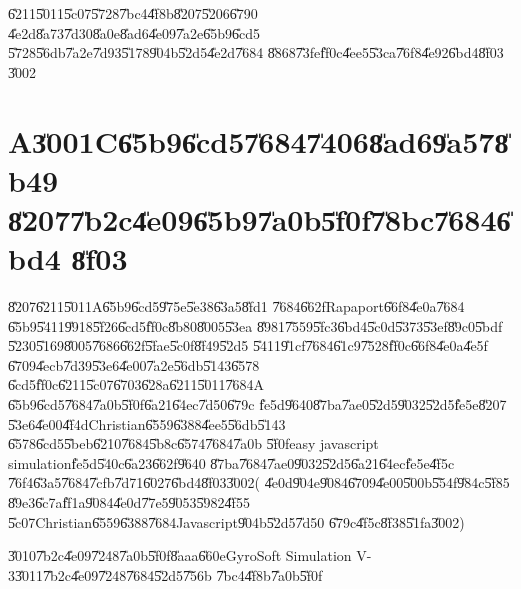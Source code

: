 \bigskip

\U{6211}\U{5011}\U{5c07}\U{5728}\U{7bc4}\U{4f8b}\U{8207}\U{5206}\U{6790}%
\U{4e2d}\U{8a73}\U{7d30}\U{8a0e}\U{8ad6}\U{4e09}\U{7a2e}\U{65b9}\U{6cd5}%
\U{5728}\U{56db}\U{7a2e}\U{7d93}\U{5178}\U{904b}\U{52d5}\U{4e2d}\U{7684}%
\U{8868}\U{73fe}\U{ff0c}\U{4ee5}\U{53ca}\U{76f8}\U{4e92}\U{6bd4}\U{8f03}%
\U{3002}

\section{A\U{3001}C\U{65b9}\U{6cd5}\U{7684}\U{7406}\U{8ad6}\U{9a57}\U{8b49}%
\U{8207}\U{7b2c}\U{4e09}\U{65b9}\U{7a0b}\U{5f0f}\U{78bc}\U{7684}\U{6bd4}%
\U{8f03}}

\U{8207}\U{6211}\U{5011}A\U{65b9}\U{6cd5}\U{975e}\U{5e38}\U{63a5}\U{8fd1}%
\U{7684}\U{662f}Rapaport\U{66f8}\U{4e0a}\cite[Page 232]{rapaport}\U{7684}%
\U{65b9}\U{5411}\U{9918}\U{5f26}\U{6cd5}\U{ff0c}\U{8b80}\U{8005}\U{53ea}%
\U{8981}\U{7559}\U{5fc3}\U{6bd4}\U{5c0d}\U{5373}\U{53ef}\U{89c0}\U{5bdf}%
\U{5230}\U{5169}\U{8005}\U{7686}\U{662f}\U{5fae}\U{5c0f}\U{8f49}\U{52d5}%
\U{5411}\U{91cf}\U{7684}\U{61c9}\U{7528}\U{ff0c}\U{66f8}\U{4e0a}\U{4e5f}%
\U{6709}\U{4ecb}\U{7d39}\U{53e6}\U{4e00}\U{7a2e}\U{56db}\U{5143}\U{6578}%
\U{6cd5}\U{ff0c}\U{6211}\U{5c07}\U{6703}\U{628a}\U{6211}\U{5011}\U{7684}A%
\U{65b9}\U{6cd5}\U{7684}\U{7a0b}\U{5f0f}\U{6a21}\U{64ec}\U{7d50}\U{679c}%
\U{fe5d}\U{9640}\U{87ba}\U{7ae0}\U{52d5}\U{9032}\U{52d5}\U{fe5e}\U{8207}%
\U{53e6}\U{4e00}\U{4f4d}Christian\U{6559}\U{6388}\U{4ee5}\U{56db}\U{5143}%
\U{6578}\U{6cd5}\U{5beb}\U{6210}\U{7684}\U{5b8c}\U{6574}\U{7684}\U{7a0b}%
\U{5f0f}easy javascript simulation\U{fe5d}\U{540c}\U{6a23}\U{662f}\U{9640}%
\U{87ba}\U{7684}\U{7ae0}\U{9032}\U{52d5}\U{6a21}\U{64ec}\U{fe5e}\U{4f5c}%
\U{76f4}\U{63a5}\U{7684}\U{7cfb}\U{7d71}\U{6027}\U{6bd4}\U{8f03}\U{3002}(%
\U{4e0d}\U{904e}\U{9084}\U{6709}\U{4e00}\U{500b}\U{554f}\U{984c}\U{5f85}%
\U{89e3}\U{6c7a}\U{ff1a}\U{9084}\U{4e0d}\U{77e5}\U{9053}\U{5982}\U{4f55}%
\U{5c07}Christian\U{6559}\U{6388}\U{7684}Javascript\U{904b}\U{52d5}\U{7d50}%
\U{679c}\U{4f5c}\U{8f38}\U{51fa}\U{3002})

\bigskip

\U{3010}\U{7b2c}\U{4e09}\U{7248}\U{7a0b}\U{5f0f}\U{8aaa}\U{660e}GyroSoft
Simulation V-3\U{3011}\U{7b2c}\U{4e09}\U{7248}\U{7684}\U{52d5}\U{756b}%
\U{7bc4}\U{4f8b}\U{7a0b}\U{5f0f}

\begin{mdframed}[leftline=false, rightline=false,backgroundcolor=bg]
\inputminted[linenos,fontsize=\footnotesize]{python}{../../Scripts/cordtrans/opengltest/cubegyro_opengl_animation_1.py}
\end{mdframed}%

